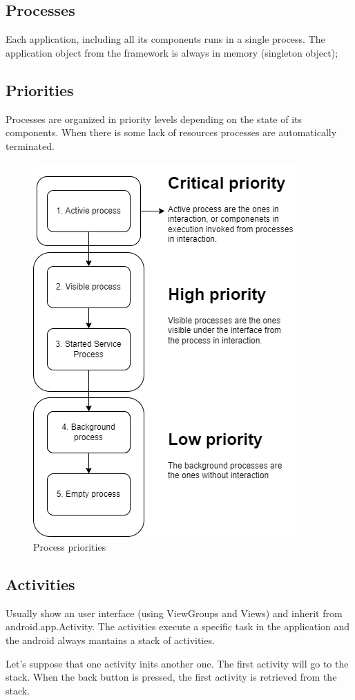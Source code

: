 
\subsection{Processes}
    Each application, including all its components runs in a single process. The 
    application object from the framework is always in memory (singleton object); 
\subsection{Priorities}
    Processes are organized in priority levels depending on the state of its components.
    When there is some lack of resources processes are automatically terminated. 

    \begin{figure}[h]
    \centering
    \includegraphics[width=0.4\linewidth]{figures/02_process_priority.png}
    \caption{Process priorities}
    \label{fig:process_priority}
    \end{figure}

\subsection{Activities}
    Usually show an user interface (using ViewGroups and Views) and inherit from android.app.Activity.
The activities execute a specific task in the application and the android always mantains a stack of 
activities. 

    Let's suppose that one activity inits another one. The first activity will go to the stack. When the 
back button is pressed, the first activity is retrieved from the stack. 

